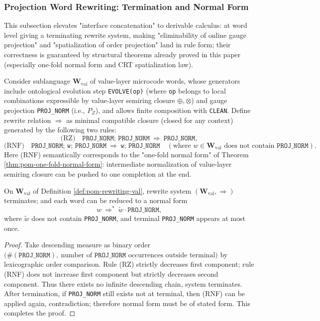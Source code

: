 \subsubsection{Projection Word Rewriting: Termination and Normal Form}\label{subsec:pom-rewriting-calculus}
This subsection elevates "interface concatenation" to derivable calculus: at word level giving a terminating rewrite system, making "eliminability of online gauge projection" and "spatialization of order projection" land in rule form; their correctness is guaranteed by structural theorems already proved in this paper (especially one-fold normal form and CRT spatialization law).

\begin{definition}\label{def:pom-rewriting-val}
Consider sublanguage \(\mathbf{W}_{\mathrm{val}}\) of value-layer microcode words, whose generators include ontological evolution step \texttt{EVOLVE(op)} (where \texttt{op} belongs to local combinations expressible by value-layer semiring closure \(\oplus,\otimes\)) and gauge projection \texttt{PROJ\_NORM} (i.e., \(P_Z\)), and allows finite composition with \texttt{CLEAN}.
Define rewrite relation \(\Rightarrow\) as minimal compatible closure (closed for any context) generated by the following two rules:
\[
\text{(RZ)}\quad
\texttt{PROJ\_NORM;\ PROJ\_NORM}\ \Rightarrow\ \texttt{PROJ\_NORM},
\]
\[
\text{(RNF)}\quad
\texttt{PROJ\_NORM;\ w;\ PROJ\_NORM}\ \Rightarrow\ \texttt{w;\ PROJ\_NORM}
\quad (\text{where }w\in\mathbf{W}_{\mathrm{val}}\text{ does not contain }\texttt{PROJ\_NORM}).
\]
Here (RNF) semantically corresponds to the "one-fold normal form" of Theorem \ref{thm:pom-one-fold-normal-form}: intermediate normalization of value-layer semiring closure can be pushed to one completion at the end.
\end{definition}

\begin{proposition}\label{prop:pom-rewriting-terminating}
On \(\mathbf{W}_{\mathrm{val}}\) of Definition \ref{def:pom-rewriting-val}, rewrite system \((\mathbf{W}_{\mathrm{val}},\Rightarrow)\) terminates; and each word can be reduced to a normal form
\[
w\ \Rightarrow^\ast\ \widetilde w\cdot \texttt{PROJ\_NORM},
\]
where \(\widetilde w\) does not contain \texttt{PROJ\_NORM}, and terminal \texttt{PROJ\_NORM} appears at most once.
\end{proposition}
\begin{proof}
Take descending measure as binary order
\(
\big(\#(\texttt{PROJ\_NORM}),\ \text{number of }\texttt{PROJ\_NORM}\text{ occurrences outside terminal}\big)
\)
by lexicographic order comparison.
Rule (RZ) strictly decreases first component; rule (RNF) does not increase first component but strictly decreases second component.
Thus there exists no infinite descending chain, system terminates. After termination, if \texttt{PROJ\_NORM} still exists not at terminal, then (RNF) can be applied again, contradiction; therefore normal form must be of stated form. This completes the proof.
\end{proof}

